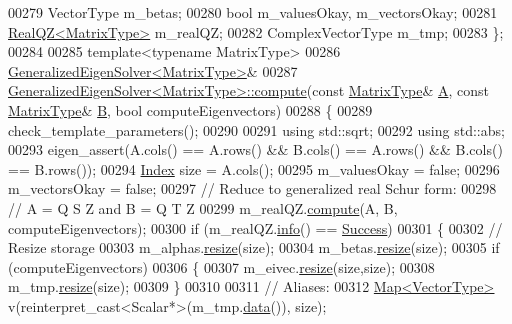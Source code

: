 \begin{DoxyCode}
{00279     VectorType m\_betas;
00280     \textcolor{keywordtype}{bool} m\_valuesOkay, m\_vectorsOkay;
00281     \hyperlink{group___eigenvalues___module}{RealQZ<MatrixType>} m\_realQZ;
00282     ComplexVectorType m\_tmp;
00283 \};
00284 
00285 \textcolor{keyword}{template}<\textcolor{keyword}{typename} MatrixType>
00286 \hyperlink{group___eigenvalues___module_class_eigen_1_1_generalized_eigen_solver}{GeneralizedEigenSolver<MatrixType>}&
00287 \hyperlink{group___eigenvalues___module_a275910b47dfe5f40211dcb59cfd68f3c}{GeneralizedEigenSolver<MatrixType>::compute}(\textcolor{keyword}{const} 
      \hyperlink{group___eigenvalues___module_a56f4b9823bb9a267de3aaf48428cd247}{MatrixType}& \hyperlink{group___core___module_class_eigen_1_1_matrix}{A}, \textcolor{keyword}{const} \hyperlink{group___eigenvalues___module_a56f4b9823bb9a267de3aaf48428cd247}{MatrixType}& \hyperlink{group___core___module_class_eigen_1_1_matrix}{B}, \textcolor{keywordtype}{bool} computeEigenvectors)
00288 \{
00289   check\_template\_parameters();
00290   
00291   \textcolor{keyword}{using} std::sqrt;
00292   \textcolor{keyword}{using} std::abs;
00293   eigen\_assert(A.cols() == A.rows() && B.cols() == A.rows() && B.cols() == B.rows());
00294   \hyperlink{group___eigenvalues___module_a46a0ff3841059479ec314e56a5645302}{Index} size = A.cols();
00295   m\_valuesOkay = \textcolor{keyword}{false};
00296   m\_vectorsOkay = \textcolor{keyword}{false};
00297   \textcolor{comment}{// Reduce to generalized real Schur form:}
00298   \textcolor{comment}{// A = Q S Z and B = Q T Z}
00299   m\_realQZ.\hyperlink{group___eigenvalues___module_a2b6847964d9f1903193cc3e67c196849}{compute}(A, B, computeEigenvectors);
00300   \textcolor{keywordflow}{if} (m\_realQZ.\hyperlink{group___eigenvalues___module_a36bd77afed89f3f5c110a715e69e4c64}{info}() == \hyperlink{group__enums_gga85fad7b87587764e5cf6b513a9e0ee5ea52581b035f4b59c203b8ff999ef5fcea}{Success})
00301   \{
00302     \textcolor{comment}{// Resize storage}
00303     m\_alphas.\hyperlink{class_eigen_1_1_plain_object_base_a99d9054ee2d5a40c6e00ded0265e9cea}{resize}(size);
00304     m\_betas.\hyperlink{class_eigen_1_1_plain_object_base_a99d9054ee2d5a40c6e00ded0265e9cea}{resize}(size);
00305     \textcolor{keywordflow}{if} (computeEigenvectors)
00306     \{
00307       m\_eivec.\hyperlink{class_eigen_1_1_plain_object_base_a99d9054ee2d5a40c6e00ded0265e9cea}{resize}(size,size);
00308       m\_tmp.\hyperlink{class_eigen_1_1_plain_object_base_a99d9054ee2d5a40c6e00ded0265e9cea}{resize}(size);
00309     \}
00310 
00311     \textcolor{comment}{// Aliases:}
00312     \hyperlink{group___core___module_class_eigen_1_1_map}{Map<VectorType>} v(reinterpret\_cast<Scalar*>(m\_tmp.\hyperlink{class_eigen_1_1_plain_object_base_ac25699535374b1854cf8494e44ad31b2}{data}()), size);
}
\end{DoxyCode}
